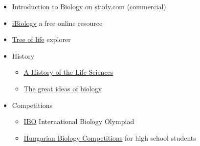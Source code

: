 \documentclass{article}
\begin{document}
\begin{itemize}
    \item \href{https://study.com/academy/course/introduction-to-biology.html}{Introduction to Biology} on study.com (commercial)
    
    \item \href{https://www.ibiology.org/}{iBiology} a free online resource 
    
    \item \href{https://www.onezoom.org/}{Tree of life} explorer
    
    \item History
    \begin{itemize}
    \item \href{https://www.goodreads.com/book/show/40951.A_History_of_the_Life_Sciences}{A History of the Life Sciences}
    \item \href{https://www.youtube.com/watch?v=llPMfaz4qnA}{The great ideas of biology}
    \end{itemize}
    \item Competitions
    \begin{itemize}
        \item \href{https://www.ibo-info.org/en/}{IBO} International Biology Olympiad
        \item \href{http://biologia.fazekas.hu/kozepiskolai-versenyek/}{Hungarian Biology Competitions} for high school students
    \end{itemize}
    

\end{itemize}
\end{document}
